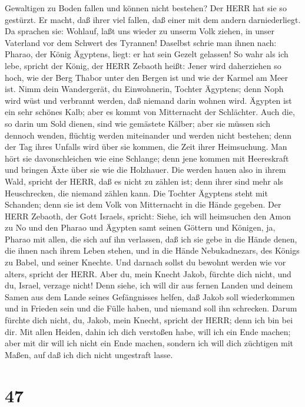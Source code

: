 Gewaltigen zu Boden fallen und können nicht bestehen? Der HERR hat sie
so gestürzt.  Er macht, daß ihrer viel fallen, daß einer
mit dem andern darniederliegt. Da sprachen sie: Wohlauf, laßt uns wieder
zu unserm Volk ziehen, in unser Vaterland vor dem Schwert des Tyrannen!
 Daselbst schrie man ihnen nach: Pharao, der König
Ägyptens, liegt: er hat sein Gezelt gelassen!  So wahr als
ich lebe, spricht der König, der HERR Zebaoth heißt: Jener wird
daherziehen so hoch, wie der Berg Thabor unter den Bergen ist und wie
der Karmel am Meer ist.  Nimm dein Wandergerät, du
Einwohnerin, Tochter Ägyptens; denn Noph wird wüst und verbrannt werden,
daß niemand darin wohnen wird.  Ägypten ist ein sehr
schönes Kalb; aber es kommt von Mitternacht der Schlächter.
 Auch die, so darin um Sold dienen, sind wie gemästete
Kälber; aber sie müssen sich dennoch wenden, flüchtig werden miteinander
und werden nicht bestehen; denn der Tag ihres Unfalls wird über sie
kommen, die Zeit ihrer Heimsuchung.  Man hört sie
davonschleichen wie eine Schlange; denn jene kommen mit Heereskraft und
bringen Äxte über sie wie die Holzhauer.  Die werden hauen
also in ihrem Wald, spricht der HERR, daß es nicht zu zählen ist; denn
ihrer sind mehr als Heuschrecken, die niemand zählen kann. 
Die Tochter Ägyptens steht mit Schanden; denn sie ist dem Volk von
Mitternacht in die Hände gegeben.  Der HERR Zebaoth, der
Gott Israels, spricht: Siehe, ich will heimsuchen den Amon zu No und den
Pharao und Ägypten samt seinen Göttern und Königen, ja, Pharao mit
allen, die sich auf ihn verlassen,  daß ich sie gebe in die
Hände denen, die ihnen nach ihrem Leben stehen, und in die Hände
Nebukadnezars, des Königs zu Babel, und seiner Knechte. Und darnach
sollst du bewohnt werden wie vor alters, spricht der HERR. 
Aber du, mein Knecht Jakob, fürchte dich nicht, und du, Israel, verzage
nicht! Denn siehe, ich will dir aus fernen Landen und deinem Samen aus
dem Lande seines Gefängnisses helfen, daß Jakob soll wiederkommen und in
Frieden sein und die Fülle haben, und niemand soll ihn schrecken.
 Darum fürchte dich nicht, du, Jakob, mein Knecht, spricht
der HERR; denn ich bin bei dir. Mit allen Heiden, dahin ich dich
verstoßen habe, will ich ein Ende machen; aber mit dir will ich nicht
ein Ende machen, sondern ich will dich züchtigen mit Maßen, auf daß ich
dich nicht ungestraft lasse.

\hypertarget{section-46}{%
\section{47}\label{section-46}}

